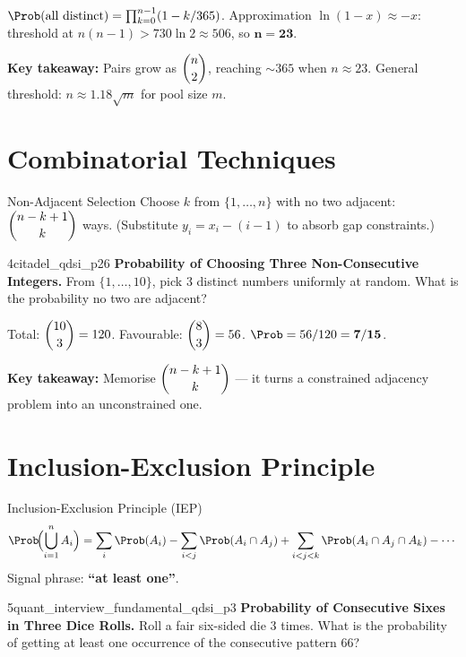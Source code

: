 \documentclass[11pt]{article}
\begin{document}
\begin{solutionbox}
$\Prob(\text{all distinct})=\prod_{k=0}^{n-1}(1-k/365)$.
Approximation $\ln(1-x)\approx-x$: threshold at $n(n-1)>730\ln2\approx506$,
so $\mathbf{n=23}$.

\textbf{Key takeaway:} Pairs grow as $\dbinom{n}{2}$, reaching $\sim365$ when $n\approx23$.
General threshold: $n\approx1.18\sqrt{m}$ for pool size $m$.
\end{solutionbox}

\section{Combinatorial Techniques}

\begin{techniquebox}{Non-Adjacent Selection}
Choose $k$ from $\{1,\ldots,n\}$ with no two adjacent:
$\dbinom{n-k+1}{k}$ ways.
(Substitute $y_i=x_i-(i-1)$ to absorb gap constraints.)
\end{techniquebox}

\begin{freeproblem}{4}{\freelabel}{}{citadel\_qdsi\_p26}
\textbf{Probability of Choosing Three Non-Consecutive Integers.}
From $\{1,\ldots,10\}$, pick 3 distinct numbers uniformly at random. What is the
probability no two are adjacent?
\end{freeproblem}

\begin{solutionbox}
Total: $\dbinom{10}{3}=120$. Favourable: $\dbinom{8}{3}=56$.
$\Prob = 56/120 = \mathbf{7/15}$.

\textbf{Key takeaway:} Memorise $\dbinom{n-k+1}{k}$ — it turns a constrained adjacency
problem into an unconstrained one.
\end{solutionbox}

\section{Inclusion-Exclusion Principle}

\begin{conceptbox}{Inclusion-Exclusion Principle (IEP)}
\[
  \Prob\!\Bigl(\bigcup_{i=1}^n A_i\Bigr)
  = \sum_i\Prob(A_i) - \sum_{i<j}\Prob(A_i\cap A_j)
  + \sum_{i<j<k}\Prob(A_i\cap A_j\cap A_k) - \cdots
\]
Signal phrase: \textbf{``at least one''}.
\end{conceptbox}

\begin{freeproblem}{5}{\freelabel}{}{quant\_interview\_fundamental\_qdsi\_p3}
\textbf{Probability of Consecutive Sixes in Three Dice Rolls.}
Roll a fair six-sided die 3 times. What is the probability of getting at least one
occurrence of the consecutive pattern $66$?
\end{freeproblem}
\end{document}
